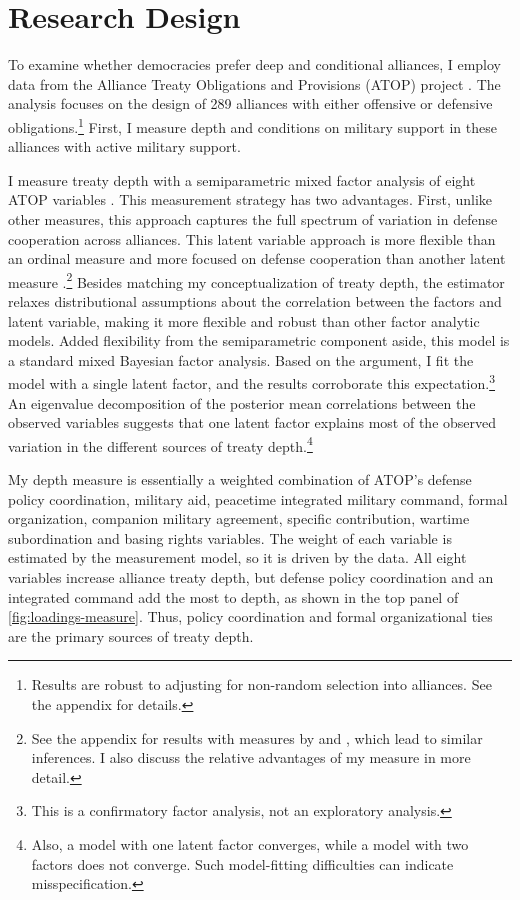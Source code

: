 \documentclass[12pt]{article}
\begin{document}
\section{Research Design}



To examine whether democracies prefer deep and conditional alliances, I employ data from the Alliance Treaty Obligations and Provisions (ATOP) project \citep{Leedsetal2002}. 
The analysis focuses on the design of 289 alliances with either offensive or defensive obligations.\footnote{Results are robust to adjusting for non-random selection into alliances. See the appendix for details.}
First, I measure depth and conditions on military support in these alliances with active military support. 


I measure treaty depth with a semiparametric mixed factor analysis of eight ATOP variables \citep{Murrayetal2013}.
This measurement strategy has two advantages. 
First, unlike other measures, this approach captures the full spectrum of variation in defense cooperation across alliances.
This latent variable approach is more flexible than an ordinal measure \citep{LeedsAnac2005} and more focused on defense cooperation than another latent measure \citep{BensonClinton2016}.\footnote{See the appendix for results with measures by \citet{LeedsAnac2005} and \citet{BensonClinton2016}, which lead to similar inferences. I also discuss the relative advantages of my measure in more detail.}
Besides matching my conceptualization of treaty depth, the estimator relaxes distributional assumptions about the correlation between the factors and latent variable, making it more flexible and robust than other factor analytic models. 
Added flexibility from the semiparametric component aside, this model is a standard mixed Bayesian factor analysis. 
Based on the argument, I fit the model with a single latent factor, and the results corroborate this expectation.\footnote{This is a confirmatory factor analysis, not an exploratory analysis.}
An eigenvalue decomposition of the posterior mean correlations between the observed variables suggests that one latent factor explains most of the observed variation in the different sources of treaty depth.\footnote{Also, a model with one latent factor converges, while a model with two factors does not converge. Such model-fitting difficulties can indicate misspecification.} 


My depth measure is essentially a weighted combination of ATOP's defense policy coordination, military aid, peacetime integrated military command, formal organization, companion military agreement, specific contribution, wartime subordination and basing rights variables.
The weight of each variable is estimated by the measurement model, so it is driven by the data.  
All eight variables increase alliance treaty depth, but defense policy coordination and an integrated command add the most to depth, as shown in the top panel of \autoref{fig:loadings-measure}. 
Thus, policy coordination and formal organizational ties are the primary sources of treaty depth. 
\end{document}
